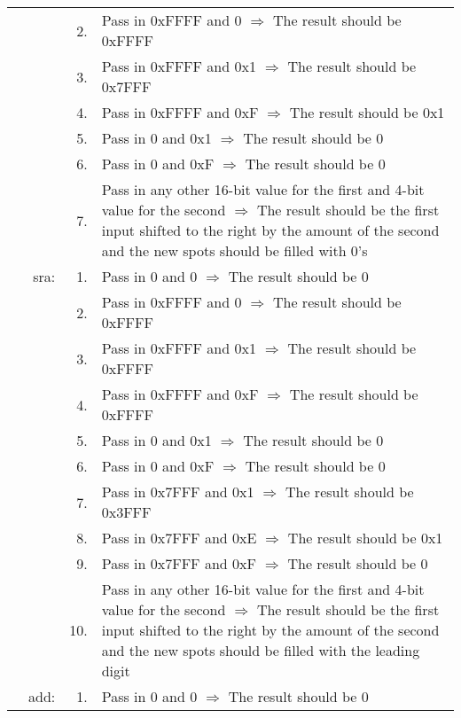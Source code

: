 \begin{longtable}{ r r r p{11cm} }
				                &      & 2. & Pass in 0xFFFF and 0 $\Rightarrow$ The result should be 0xFFFF\\
				                &      & 3. & Pass in 0xFFFF and 0x1 $\Rightarrow$ The result should be 0x7FFF\\
				                &      & 4. & Pass in 0xFFFF and 0xF $\Rightarrow$ The result should be 0x1\\
				                &      & 5. & Pass in 0 and 0x1 $\Rightarrow$ The result should be 0\\
				                &      & 6. & Pass in 0 and 0xF $\Rightarrow$ The result should be 0\\
				                &      & 7. & Pass in any other 16-bit value for the first and 4-bit value for the second $\Rightarrow$ The result should be the first input shifted to the right by the amount of the second and the new spots should be filled with 0's\\
				                & sra: & 1. & Pass in 0 and 0 $\Rightarrow$ The result should be 0\\
				                &      & 2. & Pass in 0xFFFF and 0 $\Rightarrow$ The result should be 0xFFFF\\
				                &      & 3. & Pass in 0xFFFF and 0x1 $\Rightarrow$ The result should be 0xFFFF\\
				                &      & 4. & Pass in 0xFFFF and 0xF $\Rightarrow$ The result should be 0xFFFF\\
				                &      & 5. & Pass in 0 and 0x1 $\Rightarrow$ The result should be 0\\
				                &      & 6. & Pass in 0 and 0xF $\Rightarrow$ The result should be 0\\
				                &      & 7. & Pass in 0x7FFF and 0x1 $\Rightarrow$ The result should be 0x3FFF\\
				                &      & 8. & Pass in 0x7FFF and 0xE $\Rightarrow$ The result should be 0x1\\
				                &      & 9. & Pass in 0x7FFF and 0xF $\Rightarrow$ The result should be 0\\
				                &      & 10.& Pass in any other 16-bit value for the first and 4-bit value for the second $\Rightarrow$ The result should be the first input shifted to the right by the amount of the second and the new spots should be filled with the leading digit\\
				                & add: & 1. & Pass in 0 and 0 $\Rightarrow$ The result should be 0\\

\end{longtable}
